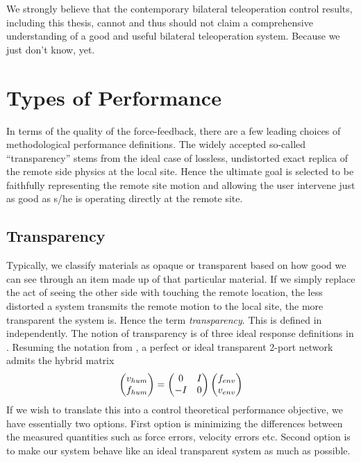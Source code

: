 We strongly believe that the contemporary bilateral teleoperation control results, including this thesis, 
cannot and thus should not claim a comprehensive understanding of a good and useful bilateral teleoperation 
system. Because we just don't know, yet.

\section{Types of Performance}

In terms of the quality of the force-feedback, there are a few leading choices of methodological performance 
definitions. The widely accepted so-called \enquote{transparency} stems from the ideal case of lossless, undistorted
exact replica of the remote side physics at the local site. Hence the ultimate goal is selected to be 
faithfully representing the remote site motion and allowing the user intervene just as good as s/he is operating 
directly at the remote site. 

\subsection{Transparency}
Typically, we classify materials as opaque or transparent based on how good we can see through an item made up of that 
particular material. If we simply replace the act of seeing the other side with touching the remote location, the 
less distorted a system transmits the remote motion to the local site, the more transparent the system is. Hence the 
term \emph{transparency}. This is defined in \cite{lawrence,yokokohjiyoshikawa} independently. The notion of 
transparency is of three ideal response definitions in \cite{yokokohjiyoshikawa}. Resuming the notation from 
, a perfect or ideal transparent 2-port network admits the hybrid matrix 
\[
\begin{pmatrix}v_{hum}\\f_{hum}\end{pmatrix}=\begin{pmatrix}0&I\\-I&0\end{pmatrix}\begin{pmatrix}f_{env}\\v_{env}\end{pmatrix}
\]
If we wish to translate this into a control theoretical performance objective, we have essentially two options. 
First option is minimizing the differences between the measured quantities such as force errors, velocity errors etc. 
Second option is to make our system behave like an ideal transparent system as much as possible. 

